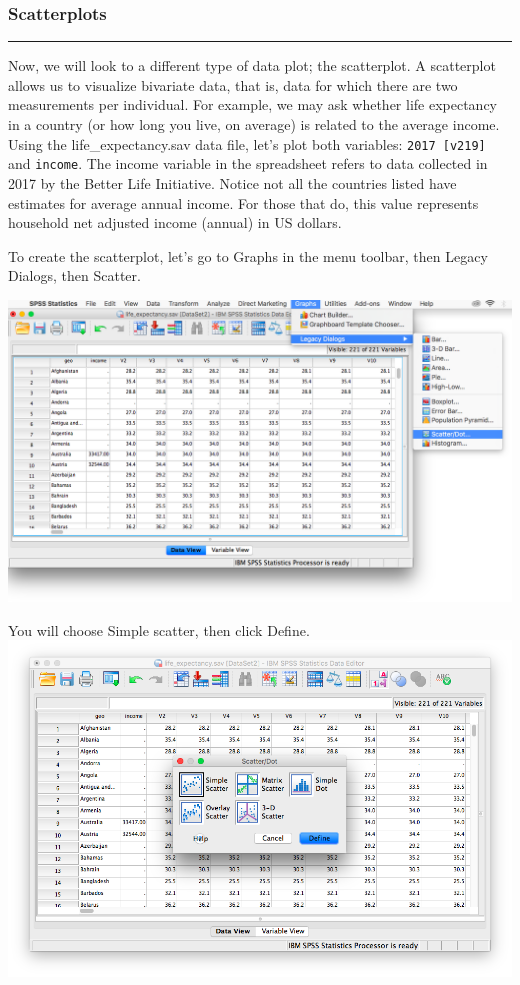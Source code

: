\documentclass[
]{book}
\begin{document}
\hypertarget{scatterplots}{%
\subsubsection{Scatterplots}\label{scatterplots}}

\begin{center}\rule{0.5\linewidth}{0.5pt}\end{center}

Now, we will look to a different type of data plot; the scatterplot. A scatterplot allows us to visualize bivariate data, that is, data for which there are two measurements per individual. For example, we may ask whether life expectancy in a country (or how long you live, on average) is related to the average income. Using the life\_expectancy.sav data file, let's plot both variables: \texttt{2017\ {[}v219{]}} and \texttt{income}. The income variable in the spreadsheet refers to data collected in 2017 by the Better Life Initiative. Notice not all the countries listed have estimates for average annual income. For those that do, this value represents household net adjusted income (annual) in US dollars.

To create the scatterplot, let's go to {Graphs} in the menu toolbar, then {Legacy Dialogs}, then {Scatter}.

\includegraphics{img/1.4.21.png}

You will choose {Simple} scatter, then click {Define}.
\includegraphics{img/1.4.22.png}
\end{document}
